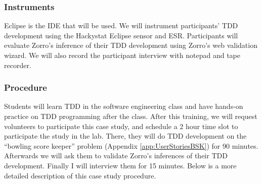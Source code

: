 \subsubsection{Instruments}
Eclipse is the IDE that will be used. We will instrument participants'
TDD development using the Hackystat Eclipse sensor\cite{SensorInstall}
and ESR\cite{esr}. Participants will evaluate Zorro's inference of
their TDD development using Zorro's web validation wizard. We will
also record the participant interview with notepad and tape recorder.

\subsubsection{Procedure}
Students will learn TDD in the software engineering class and have
hands-on practice on TDD programming after the class. After this
training, we will request volunteers to participate this case study,
and schedule a 2 hour time slot to participate the study in the lab.
There, they will do TDD development on the ``bowling score keeper''
problem (Appendix \ref{app:UserStoriesBSK}) for 90 minutes. Afterwards we
will ask them to validate Zorro's inferences of their TDD
development. Finally I will interview them for 15 minutes. Below is a
more detailed description of this case study procedure.


